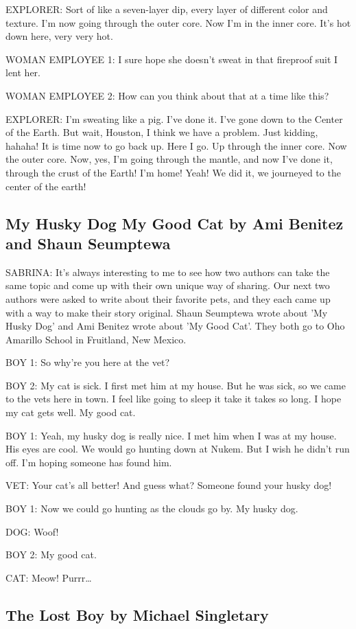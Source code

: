 EXPLORER:
Sort of like a seven-layer dip, every layer of different color and texture.
I'm now going through the outer core.
Now I'm in the inner core.
It's hot down here, very very hot.

WOMAN EMPLOYEE 1:
I sure hope she doesn't sweat in that fireproof suit I lent her.

WOMAN EMPLOYEE 2:
How can you think about that at a time like this?

EXPLORER:
I'm sweating like a pig.
I've done it.
I've gone down to the Center of the Earth.
But wait, Houston, I think we have a problem.
Just kidding, hahaha!
It is time now to go back up.
Here I go.
Up through the inner core.
Now the outer core.
Now, yes, I'm going through the mantle, and now I've done it, through the crust of the Earth!
I'm home!
Yeah!
We did it, we journeyed to the center of the earth!

\subsection{My Husky Dog My Good Cat by Ami Benitez and Shaun Seumptewa}

SABRINA:
It's always interesting to me to see how two authors can take the same topic and come up with their own unique way of sharing.
Our next two authors were asked to write about their favorite pets, and they each came up with a way to make their story original.
Shaun Seumptewa wrote about 'My Husky Dog' and Ami Benitez wrote about 'My Good Cat'.
They both go to Oho Amarillo School in Fruitland, New Mexico.

BOY 1:
So why're you here at the vet?

BOY 2:
My cat is sick.
I first met him at my house.
But he was sick, so we came to the vets here in town.
I feel like going to sleep it take it takes so long.
I hope my cat gets well.
My good cat.

BOY 1:
Yeah, my husky dog is really nice.
I met him when I was at my house.
His eyes are cool.
We would go hunting down at Nukem.
But I wish he didn't run off.
I'm hoping someone has found him.

VET:
Your cat's all better!
And guess what?
Someone found your husky dog!

BOY 1:
Now we could go hunting as the clouds go by.
My husky dog.

DOG:
Woof!

BOY 2:
My good cat.

CAT:
Meow!
Purrr\dots

\subsection{The Lost Boy by Michael Singletary}

